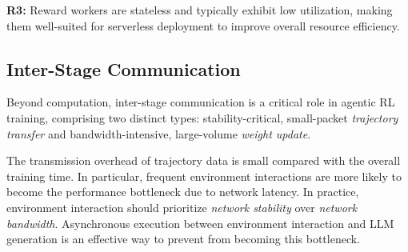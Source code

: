 \begin{tcolorbox}[colback=blue!5!white,colframe=gray!75!black,left=1mm, right=1mm, top=0.5mm, bottom=0.5mm, arc=1mm]
\noindent\textbf{R3:} Reward workers are stateless and typically exhibit low utilization, making them well-suited for serverless deployment to improve overall resource efficiency.
\end{tcolorbox}


\subsection{Inter-Stage Communication}
\label{subsec:communication-between-stage}

Beyond computation, inter-stage communication is a critical role in agentic RL training, comprising two distinct types: stability-critical, small-packet \emph{trajectory transfer} and bandwidth-intensive, large-volume \emph{weight update}.


\begin{table}[t]
\centering
\caption{\small Transmission overhead from the training cluster to the inference cluster over TCP and RDMA.}
\label{tab:llm-transmission}
\scriptsize
{} %
\end{table}


 The transmission overhead of trajectory data is small compared with the overall training time. In particular, frequent environment interactions are more likely to become the performance bottleneck due to network latency. In practice, environment interaction should prioritize \emph{network stability} over \emph{network bandwidth}. Asynchronous execution between environment interaction and LLM generation is an effective way to prevent from becoming this bottleneck.


